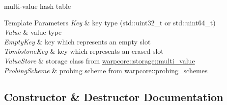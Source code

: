 multi-\/value hash table 


\begin{DoxyTemplParams}{Template Parameters}
{\em Key} & key type ({\ttfamily std\+::uint32\+\_\+t} or {\ttfamily std\+::uint64\+\_\+t}) \\
\hline
{\em Value} & value type \\
\hline
{\em Empty\+Key} & key which represents an empty slot \\
\hline
{\em Tombstone\+Key} & key which represents an erased slot \\
\hline
{\em Value\+Store} & storage class from {\ttfamily \hyperlink{namespacewarpcore_1_1storage_1_1multi__value}{warpcore\+::storage\+::multi\+\_\+value}} \\
\hline
{\em Probing\+Scheme} & probing scheme from {\ttfamily \hyperlink{namespacewarpcore_1_1probing__schemes}{warpcore\+::probing\+\_\+schemes}} \\
\hline
\end{DoxyTemplParams}


\subsection{Constructor \& Destructor Documentation}
\mbox{\label{classwarpcore_1_1MultiValueHashTable_addc8eff5737fc71abef7a193d89b4285}} 
